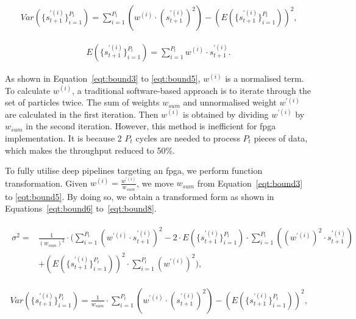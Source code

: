 \begin{equation}
\begin{aligned}
Var(\{s_{t+1}^{'(i)}\}^{P_t}_{i=1}) = \sum_{i=1}^{P_{t}} \left ( {w}^{(i)} \cdot (s_{t+1}^{'(i)})^2 \right ) - \left( E(\{s_{t+1}^{'(i)}\}^{P_t}_{i=1}) \right)^2 \mbox{,}
\end{aligned}
\label{eqt:bound4}
\end{equation}

\begin{equation}
\begin{aligned}
E(\{s_{t+1}^{'(i)}\}^{P_t}_{i=1}) = \sum_{i=1}^{P_{t}} {w}^{(i)} \cdot s_{t+1}^{'(i)} \mbox{.}
\end{aligned}
\label{eqt:bound5}
\end{equation}

As shown in Equation~\ref{eqt:bound3} to \ref{eqt:bound5}, ${w}^{(i)}$ is a normalised term. 
To calculate $w^{(i)}$, a traditional software-based approach is to iterate through the set of particles twice.
The sum of weights $w_{sum}$ and unnormalised weight $w^{'(i)}$ are calculated in the first iteration.
Then $w^{(i)}$ is obtained by dividing $w^{'(i)}$ by $w_{sum}$ in the second iteration.
However, this method is inefficient for \gls{fpga} implementation.
It is because 2 $P_t$ cycles are needed to process $P_t$ pieces of data, which makes the throughput reduced to 50\%.

To fully utilise deep pipelines targeting an \gls{fpga}, we perform function transformation.
Given ${w}^{(i)} = \frac{w^{'(i)}}{w_{sum}}$, we move $w_{sum}$ from Equation~\ref{eqt:bound3} to \ref{eqt:bound5}.
By doing so, we obtain a transformed form as shown in Equations~\ref{eqt:bound6} to~\ref{eqt:bound8}.

\begin{eqnarray}
\begin{aligned}
\sigma^2 = & \frac{1}{(w_{sum})^2} \cdot ( \sum_{i=1}^{P_{t}}\left(w^{'(i)} \cdot s_{t+1}^{'(i)} \right)^2 - 2 \cdot E(\{s_{t+1}^{'(i)}\}^{P_t}_{i=1}) \cdot \sum_{i=1}^{P_{t}} \left ( (w^{'(i)})^2 \cdot s_{t+1}^{'(i)} \right )\\
& + \left(E(\{s_{t+1}^{'(i)}\}^{P_t}_{i=1})\right)^2 \cdot \sum_{i=1}^{P_{t}}(w^{'(i)})^2 ) \mbox{,}
\end{aligned}
\label{eqt:bound6}
\end{eqnarray}

\begin{equation}
\begin{aligned}
Var(\{s_{t+1}^{'(i)}\}^{P_t}_{i=1}) = \frac{1}{w_{sum}} \cdot \sum_{i=1}^{P_{t}} \left ( w^{'(i)} \cdot (s_{t+1}^{'(i)})^2 \right ) - \left( E(\{s_{t+1}^{'(i)}\}^{P_t}_{i=1}) \right)^2 \mbox{,}
\end{aligned}
\label{eqt:bound7}
\end{equation}

